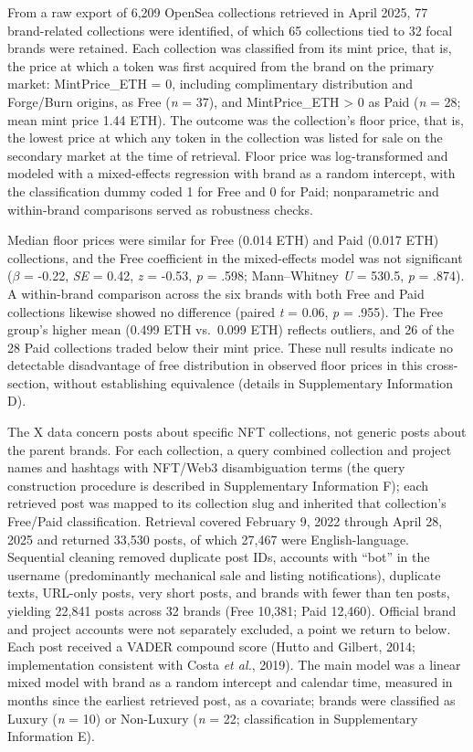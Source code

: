 \documentclass[12pt, a4paper]{article}
\begin{document}
From a raw export of 6,209 OpenSea collections retrieved in April 2025, 77 brand-related collections were identified, of which 65 collections tied to 32 focal brands were retained. Each collection was classified from its mint price, that is, the price at which a token was first acquired from the brand on the primary market: MintPrice\_ETH = 0, including complimentary distribution and Forge/Burn origins, as Free (\emph{n} = 37), and MintPrice\_ETH \textgreater{} 0 as Paid (\emph{n} = 28; mean mint price 1.44 ETH). The outcome was the collection's floor price, that is, the lowest price at which any token in the collection was listed for sale on the secondary market at the time of retrieval. Floor price was log-transformed and modeled with a mixed-effects regression with brand as a random intercept, with the classification dummy coded 1 for Free and 0 for Paid; nonparametric and within-brand comparisons served as robustness checks.

Median floor prices were similar for Free (0.014 ETH) and Paid (0.017 ETH) collections, and the Free coefficient in the mixed-effects model was not significant ($\beta$ = -0.22, \emph{SE} = 0.42, \emph{z} = -0.53, \emph{p} = .598; Mann--Whitney \emph{U} = 530.5, \emph{p} = .874). A within-brand comparison across the six brands with both Free and Paid collections likewise showed no difference (paired \emph{t} = 0.06, \emph{p} = .955). The Free group's higher mean (0.499 ETH vs.\ 0.099 ETH) reflects outliers, and 26 of the 28 Paid collections traded below their mint price. These null results indicate no detectable disadvantage of free distribution in observed floor prices in this cross-section, without establishing equivalence (details in Supplementary Information D).

The X data concern posts about specific NFT collections, not generic posts about the parent brands. For each collection, a query combined collection and project names and hashtags with NFT/Web3 disambiguation terms (the query construction procedure is described in Supplementary Information F); each retrieved post was mapped to its collection slug and inherited that collection's Free/Paid classification. Retrieval covered February 9, 2022 through April 28, 2025 and returned 33,530 posts, of which 27,467 were English-language. Sequential cleaning removed duplicate post IDs, accounts with ``bot'' in the username (predominantly mechanical sale and listing notifications), duplicate texts, URL-only posts, very short posts, and brands with fewer than ten posts, yielding 22,841 posts across 32 brands (Free 10,381; Paid 12,460). Official brand and project accounts were not separately excluded, a point we return to below. Each post received a VADER compound score (Hutto and Gilbert, 2014; implementation consistent with Costa \emph{et al.}, 2019). The main model was a linear mixed model with brand as a random intercept and calendar time, measured in months since the earliest retrieved post, as a covariate; brands were classified as Luxury (\emph{n} = 10) or Non-Luxury (\emph{n} = 22; classification in Supplementary Information E).
\end{document}
